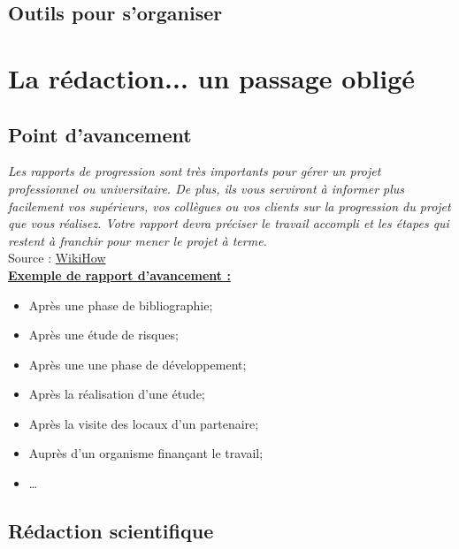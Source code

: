 \documentclass[a4paper,12pt]{report}
\begin{document}
\FloatBarrier
\subsection{Outils pour s'organiser}






\FloatBarrier
\newpage
\section{La rédaction... un passage obligé}
\subsection{Point d'avancement}

\textit{Les rapports de progression sont très importants pour gérer un projet professionnel ou universitaire. De plus, ils vous serviront à informer plus facilement vos supérieurs, vos collègues ou vos clients sur la progression du projet que vous réalisez. Votre rapport devra préciser le travail accompli et les étapes qui restent à franchir pour mener le projet à terme.} \\

Source : \href{https://fr.wikihow.com/r\%C3\%A9diger-un-rapport-d\%27avancement}{WikiHow} \\

\underline{\textbf{Exemple de rapport d'avancement :}}\\
\begin{itemize}
\item Après une phase de bibliographie;
\item Après une étude de risques;
\item Après une une phase de développement;
\item Après la réalisation d'une étude;
\item Après la visite des locaux d'un partenaire;
\item Auprès d'un organisme finançant le travail;
\item \ldots
\end{itemize}



\FloatBarrier
\subsection{Rédaction scientifique}
\end{document}
